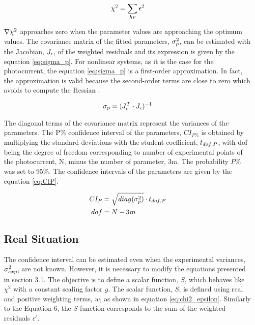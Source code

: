 \begin{equation}
\begin{split}
\chi ^2 = \sum _{h\nu} \epsilon ^2
\end{split}
\label{eq:chi2_epsilon}
\end{equation}

$\nabla \chi ^2$ approaches zero when the parameter values are approaching the optimum values. 
The covariance matrix of the fitted parameters, $\sigma _{p} ^2$, can be estimated 
with the Jacobian, $J _{\epsilon}$, of the weighted residuals \citep{bevington2003} and 
its expression is given by the equation \ref{eq:sigma_p}. For nonlinear systems, 
as it is the case for the photocurrent, the equation \ref{eq:sigma_p} is a 
first-order approximation. In fact, the approximation is valid because the 
second-order terms are close to zero which avoids to compute the Hessian \citep{press2007}.

\begin{equation}
\begin{split}
\sigma _{p} = ( J _{\epsilon} ^T \cdot J _{\epsilon} ) ^{-1}
\end{split}
\label{eq:sigma_p}
\end{equation}

The diagonal terms of the covariance matrix represent the variances of the parameters. 
The P\% confidence interval of the parameters, $CI_{P\%}$ is obtained by 
multiplying the standard deviations with the student coefficient, $t_{dof,P}$, 
with dof being the degree of freedom corresponding to number of experimental 
points of the photocurrent, N, minus the number of parameter, 3m. 
The probability $P\%$ was set to 95\%. The confidence intervals of the parameters 
are given by the equation \ref{eq:CIP}.

\begin{equation}
\begin{split}
CI_P &= \sqrt{ diag(\sigma _{p} ^2)} \cdot t_{dof,P} \\
dof &= N-3m
\end{split}
\label{eq:CIP}
\end{equation}

\subsection{Real Situation}
The confidence interval can be estimated even when the experimental variances, 
$\sigma _{exp} ^2$, are not known. However, it is necessary to modify the equations 
presented in section 3.1. The objective is to define a scalar function, $S$, 
which behaves like $\chi ^2$ with a constant scaling factor $g$. 
The scalar function, $S$, is defined using real and positive weighting terms, 
$w$, as shown in equation \ref{eq:chi2_epsilon}. Similarly to the Equation 6, 
the $S$ function corresponds to the sum of the weighted residuals $\epsilon ^{\prime}$.

